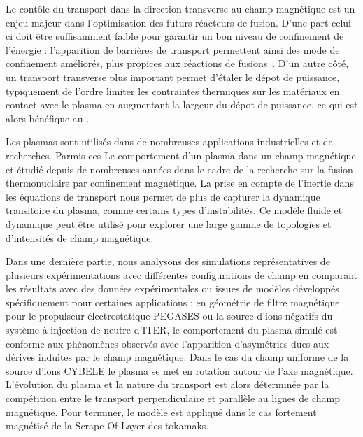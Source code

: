 
\begin{refsection}


Le contôle du transport dans la direction
transverse au champ magnétique est un enjeu majeur dans l'optimisation des
futurs réacteurs de fusion. D'une part celui-ci doit être suffisamment
faible pour garantir un bon niveau de confinement de l'énergie : l'apparition de
barrières de transport permettent ainsi des mode de confinement améliorés, plus
propices aux réactions de
fusions~\parencite{GarbetBarriere,Ghendrih}. D'un autre côté, un transport transverse plus important permet d'étaler le dépot de puissance,
typiquement de l'ordre  limiter les contraintes thermiques sur les matériaux en
contact avec le plasma en augmentant la largeur du dépot de puissance, ce qui est alors bénéfique au .

	Les plasmas sont utilisés dans de nombreuses applications industrielles et de
	recherches. Parmis ces Le comportement d'un plasma dans un champ magnétique et
	étudié depuis de nombreuses années dans le cadre de la recherche sur la fusion thermonuclaire par confinement magnétique.  La prise en compte de l'inertie
	dans les équations de transport nous permet de plus de capturer la dynamique transitoire du plasma, comme certains types d'instabilités. Ce modèle fluide et dynamique peut être utilisé pour explorer
		une large gamme de topologies et d'intensités de champ magnétique.
				
		
		Dans une dernière partie, nous analysons des simulations représentatives de
		plusieurs expérimentations avec différentes configurations de champ en comparant
		les résultats avec des données expérimentales ou issues de modèles développés
		spécifiquement pour certaines applications :
		en géométrie de filtre magnétique pour le propulseur électrostatique PEGASES
		ou la source d'ions négatifs du système à injection de neutre d'ITER, le
		comportement du plasma simulé est conforme aux phénomènes observés avec
		l’apparition d’asymétries dues aux dérives induites par le champ magnétique.
		Dans le cas du champ uniforme de la source d'ions CYBELE le plasma se met en
		rotation autour de l'axe magnétique. L'évolution du plasma et la nature du
		transport est alors déterminée par la compétition entre le transport
		perpendiculaire et parallèle au lignes de champ magnétique. Pour terminer, le
		modèle est appliqué dans le cas fortement magnétisé de la Scrape-Of-Layer des
		tokamaks.
		

\end{refsection}
